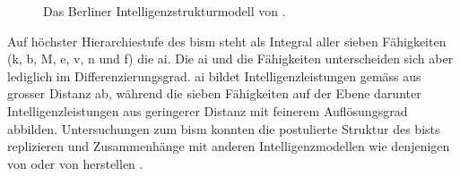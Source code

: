 \documentclass[11pt, twoside, a4paper]{book}		%
\begin{document}
\begin{figure}[t]
\begin{adjustbox}{width=.9\textwidth}
	\end{adjustbox}
	\vspace*{.5cm}
	\caption[Das Berliner Intelligenzstrukturmodell]{Das Berliner Intelligenzstrukturmodell von \citet{Jaeger1984}.}
	\label{fig:bis_model}
\end{figure}

Auf höchster Hierarchiestufe des \gls{bism} steht als Integral aller sieben Fähigkeiten (\gls{k}, \gls{b}, \gls{M}, \gls{e}, \gls{v}, \gls{n} und \gls{f}) die \gls{ai}. Die \gls{ai} und die Fähigkeiten unterscheiden sich aber lediglich im Differenzierungsgrad. \gls{ai} bildet Intelligenzleistungen gemäss \citet{Jaeger1984} aus grosser Distanz ab, während die sieben Fähigkeiten auf der Ebene darunter Intelligenzleistungen aus geringerer Distanz mit feinerem Auflösungsgrad abbilden. Untersuchungen zum \gls{bism} konnten die postulierte Struktur des \gls{bist}s replizieren  und Zusammenhänge mit anderen Intelligenzmodellen wie denjenigen von \citet{Cattell1971}  oder von \citet{Carroll1993} herstellen \citep{Bucik1996, Beauducel2002, Suess2002}.
\end{document}
